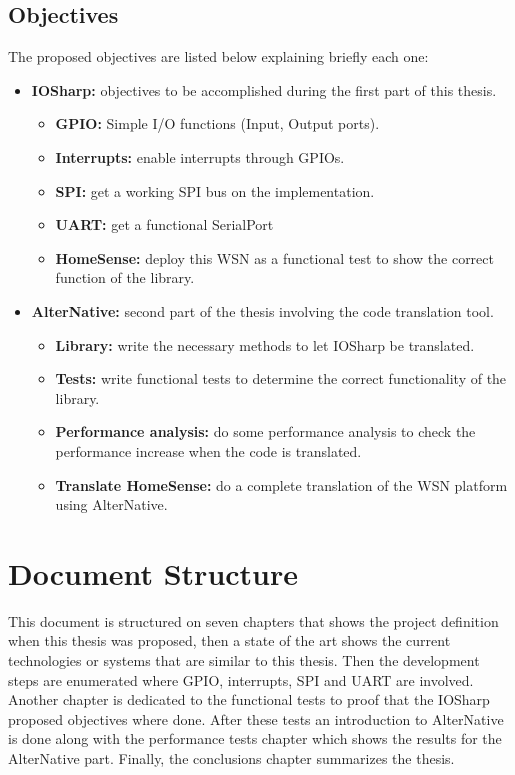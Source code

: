 \subsection{Objectives}\label{SS:Proposal-Objectives}
The proposed objectives are listed below explaining briefly each one:  
\begin{itemize}
	\item \textbf{IOSharp:} objectives to be accomplished during the first part of this thesis.
		\begin{itemize}
		\item \textbf{GPIO:} Simple I/O functions (Input, Output ports).
		\item \textbf{Interrupts:} enable interrupts through GPIOs.
		\item \textbf{SPI:} get a working SPI bus on the implementation.
		\item \textbf{UART:} get a functional SerialPort
		\item \textbf{HomeSense:} deploy this WSN as a functional test to show the correct function of the library.
		\end{itemize}
	\item \textbf{AlterNative:} second part of the thesis involving the code translation tool.
		\begin{itemize}
		\item \textbf{Library:} write the necessary methods to let IOSharp be translated.
		\item \textbf{Tests:} write functional tests to determine the correct functionality of the library.
		\item \textbf{Performance analysis:} do some performance analysis to check the performance increase when the code is translated.
		\item \textbf{Translate HomeSense:} do a complete translation of the WSN platform using AlterNative.
		\end{itemize}
\end{itemize}


\section{Document Structure}\label{SS:Proposal-Doc-Structure}
This document is structured on seven chapters that shows the project definition when this thesis was proposed, then a state of the art shows the current technologies or systems that are similar to this thesis. Then the development steps are enumerated where GPIO, interrupts, SPI and UART are involved. Another chapter is dedicated to the functional tests to proof that the IOSharp proposed objectives where done. After these tests an introduction to AlterNative is done along with the performance tests chapter which shows the results for the AlterNative part. Finally, the conclusions chapter summarizes the thesis.